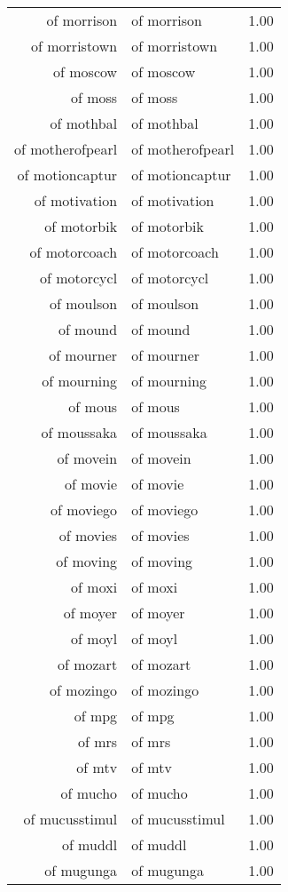 \begin{table}[ht]
\begin{tabular}{rlr}
  of morrison & of morrison & 1.00 \\ 
  of morristown & of morristown & 1.00 \\ 
  of moscow & of moscow & 1.00 \\ 
  of moss & of moss & 1.00 \\ 
  of mothbal & of mothbal & 1.00 \\ 
  of motherofpearl & of motherofpearl & 1.00 \\ 
  of motioncaptur & of motioncaptur & 1.00 \\ 
  of motivation & of motivation & 1.00 \\ 
  of motorbik & of motorbik & 1.00 \\ 
  of motorcoach & of motorcoach & 1.00 \\ 
  of motorcycl & of motorcycl & 1.00 \\ 
  of moulson & of moulson & 1.00 \\ 
  of mound & of mound & 1.00 \\ 
  of mourner & of mourner & 1.00 \\ 
  of mourning & of mourning & 1.00 \\ 
  of mous & of mous & 1.00 \\ 
  of moussaka & of moussaka & 1.00 \\ 
  of movein & of movein & 1.00 \\ 
  of movie & of movie & 1.00 \\ 
  of moviego & of moviego & 1.00 \\ 
  of movies & of movies & 1.00 \\ 
  of moving & of moving & 1.00 \\ 
  of moxi & of moxi & 1.00 \\ 
  of moyer & of moyer & 1.00 \\ 
  of moyl & of moyl & 1.00 \\ 
  of mozart & of mozart & 1.00 \\ 
  of mozingo & of mozingo & 1.00 \\ 
  of mpg & of mpg & 1.00 \\ 
  of mrs & of mrs & 1.00 \\ 
  of mtv & of mtv & 1.00 \\ 
  of mucho & of mucho & 1.00 \\ 
  of mucusstimul & of mucusstimul & 1.00 \\ 
  of muddl & of muddl & 1.00 \\ 
  of mugunga & of mugunga & 1.00 \\ 

\end{tabular}
\end{table}
